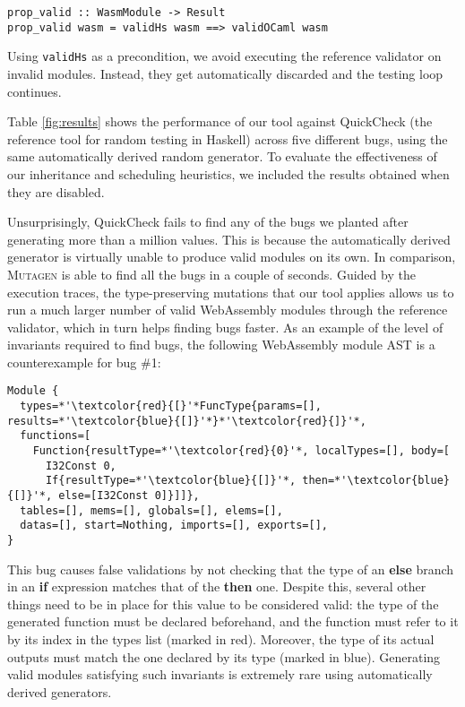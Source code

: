 \documentclass[10pt,conference]{IEEEtran}
\newcommand{\ourtool}{\textsc{Mutagen}\xspace}
\begin{document}
\vspace{-3pt}
\begin{lstlisting}
prop_valid :: WasmModule -> Result
prop_valid wasm = validHs wasm ==> validOCaml wasm
\end{lstlisting}
\vspace{-3pt}

Using {\small\texttt{validHs}} as a precondition, we avoid executing the
reference validator on invalid modules.
%
Instead, they get automatically discarded and the testing loop continues.


Table \ref{fig:results} shows the performance of our tool against QuickCheck
\cite{claessen2011quickcheck} (the reference tool for random testing in Haskell)
across five different bugs, using the same automatically derived random
generator.
%
To evaluate the effectiveness of our inheritance and scheduling heuristics, we
included the results obtained when they are disabled.


Unsurprisingly, QuickCheck fails to find any of the bugs we planted after
generating more than a million values.
%
This is because the automatically derived generator is virtually unable to
produce valid modules on its own.
%
In comparison, \ourtool is able to find all the bugs in a couple of seconds.
%
Guided by the execution traces, the type-preserving mutations that our tool
applies allows us to run a much larger number of valid WebAssembly modules through
the reference validator, which in turn helps finding bugs faster.
%
As an example of the level of invariants required to find bugs, the following
WebAssembly module AST is a counterexample for bug \#1:

\vspace{-3pt}
\begin{lstlisting}
Module {
  types=*'\textcolor{red}{[}'*FuncType{params=[], results=*'\textcolor{blue}{[]}'*}*'\textcolor{red}{]}'*,
  functions=[
    Function{resultType=*'\textcolor{red}{0}'*, localTypes=[], body=[
      I32Const 0,
      If{resultType=*'\textcolor{blue}{[]}'*, then=*'\textcolor{blue}{[]}'*, else=[I32Const 0]}]]},
  tables=[], mems=[], globals=[], elems=[],
  datas=[], start=Nothing, imports=[], exports=[],
}
\end{lstlisting}
\vspace{-3pt}

\noindent This bug causes false validations by not checking that the type of an
\textbf{else} branch in an \textbf{if} expression matches that of the
\textbf{then} one.
%
%
%
Despite this, several other things need to be in place for this value to be
considered valid: the type of the generated function must be declared
beforehand, and the function must refer to it by its index in the types list
(marked in red).
%
Moreover, the type of its actual outputs must match the one declared by its type
(marked in blue).
%
Generating valid modules satisfying such invariants is extremely rare using
automatically derived generators.
\end{document}
